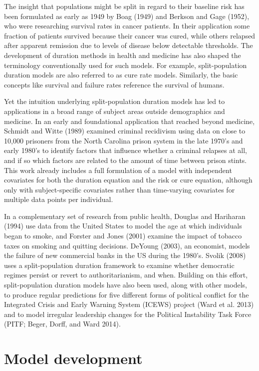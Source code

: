 \documentclass[article]{jss}
\begin{document}
The insight that populations might be split in regard to their baseline
risk has been formulated as early as 1949 by Boag (1949) and Berkson and
Gage (1952), who were researching survival rates in cancer patients. In
their application some fraction of patients survived because their
cancer was cured, while others relapsed after apparent remission due to
levels of disease below detectable thresholds. The development of
duration methods in health and medicine has also shaped the terminology
conventionally used for such models. For example, split-population
duration models are also referred to as cure rate models. Similarly, the
basic concepts like survival and failure rates reference the survival of
humans.

Yet the intuition underlying split-population duration models has led to
applications in a broad range of subject areas outside demographics and
medicine. In an early and foundational application that reached beyond
medicine, Schmidt and Witte (1989) examined criminal recidivism using
data on close to 10,000 prisoners from the North Carolina prison system
in the late 1970's and early 1980's to identify factors that influence
whether a criminal relapses at all, and if so which factors are related
to the amount of time between prison stints. This work already includes
a full formulation of a model with independent covariates for both the
duration equation and the risk or cure equation, although only with
subject-specific covariates rather than time-varying covariates for
multiple data points per individual.

In a complementary set of research from public health, Douglas and
Hariharan (1994) use data from the United States to model the age at
which individuals began to smoke, and Forster and Jones (2001) examine
the impact of tobacco taxes on smoking and quitting decisions. DeYoung
(2003), an economist, models the failure of new commercial banks in the
US during the 1980's. Svolik (2008) uses a split-population duration
framework to examine whether democratic regimes persist or revert to
authoritarianism, and when. Building on this effort, split-population
duration models have also been used, along with other models, to produce
regular predictions for five different forms of political conflict for
the Integrated Crisis and Early Warning System (ICEWS) project (Ward et
al. 2013) and to model irregular leadership changes for the Political
Instability Task Force (PITF; Beger, Dorff, and Ward 2014).

\section{Model development}\label{model-development}
\end{document}
